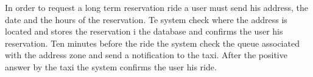 	In order to request a long term reservation ride a user must send his address, the date and the hours of the reservation. Te system check where the address is located and stores the reservation i the database and confirms the user his reservation. Ten minutes before the ride the system check the queue associated with the address zone and send a notification to the taxi. After the positive answer by the taxi the system confirms the user his ride.
